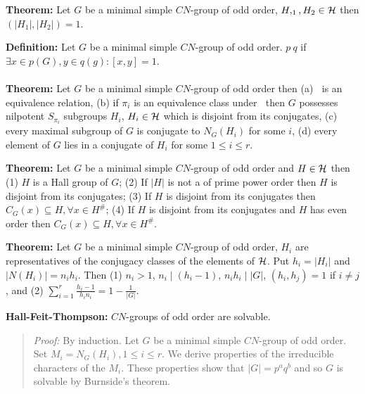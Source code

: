 {\bf Theorem:} Let $G$ be a minimal simple $CN$-group of odd order, $H,_1, H_2 \in {\cal H}$ then
$(|H_1|, |H_2|) = 1$.
\begin{quote}
\end{quote}
{\bf Definition:}
Let $G$ be a minimal simple $CN$-group of odd order.
$p~q$ if $\exists x \in p(G), y \in q(g): [x,y] = 1$.
\\
\\
{\bf Theorem:} Let $G$ be a minimal simple $CN$-group of odd order
then (a) $~$ is an
equivalence relation, (b) if $\pi_i$ is an equivalence class under $~$ then $G$ possesses
nilpotent $S_{\pi_i}$ subgroups $H_i$, $H_i \in {\cal H}$ which is disjoint from its conjugates,
(c) every maximal subgroup of $G$ is conjugate to $N_G(H_i)$ for some $i$,
(d) every element of $G$ lies in a conjugate of $H_i$ for some $1 \leq i \leq r$.
\begin{quote}
\end{quote}
{\bf Theorem:} Let $G$ be a minimal simple $CN$-group of odd order and $H \in {\cal H}$
then
(1) $H$ is a Hall group of $G$;
(2) If $|H|$ is not a of prime power order then $H$ is disjoint from its conjugates;
(3) If $H$ is disjoint from its conjugates then $C_G(x) \subseteq H, \forall x \in H^{\#}$;
(4) If $H$ is disjoint from its conjugates and $H$ has even order then 
$C_G(x) \subseteq H, \forall x \in H^{\#}$.
\begin{quote}
\end{quote}
{\bf Theorem:} 
Let $G$ be a minimal simple $CN$-group of odd order, $H_i$ are representatives of
the conjugacy classes of the elements of ${\cal H}$.  Put $h_i= |H_i|$ and
$|N(H_i)|=n_i h_i$. Then (1) $n_i > 1$, $n_i \mid (h_i - 1)$, $n_ih_i \mid |G|$, $(h_i, h_j)=1$
if $i \ne j$, and (2) $\sum_{i=1}^{r} {\frac {h_i - 1} {h_i n_i}} = 1 - {\frac 1 {|G|}}$.
\begin{quote}
\end{quote}
{\bf Hall-Feit-Thompson:} $CN$-groups of odd order are solvable.
\begin{quote}
\emph{Proof:}  
By induction. Let $G$ be a minimal simple $CN$-group of odd order.
Set $M_i = N_G(H_i), 1 \leq i \leq r$.  We derive properties of the irreducible characters of
the $M_i$.
These properties show that $|G|=p^a q^b$ and so $G$ is solvable by Burnside's theorem.
\end{quote}
